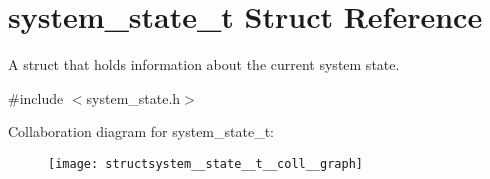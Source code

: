 \hypertarget{structsystem__state__t}{}\section{system\+\_\+state\+\_\+t Struct Reference}
\label{structsystem__state__t}


A struct that holds information about the current system state.  




{\ttfamily \#include $<$system\+\_\+state.\+h$>$}



Collaboration diagram for system\+\_\+state\+\_\+t\+:
\nopagebreak
\begin{figure}[H]
\begin{center}
\leavevmode
\texttt{[image: structsystem\_\_state\_\_t\_\_coll\_\_graph]}
\end{center}
\end{figure}
